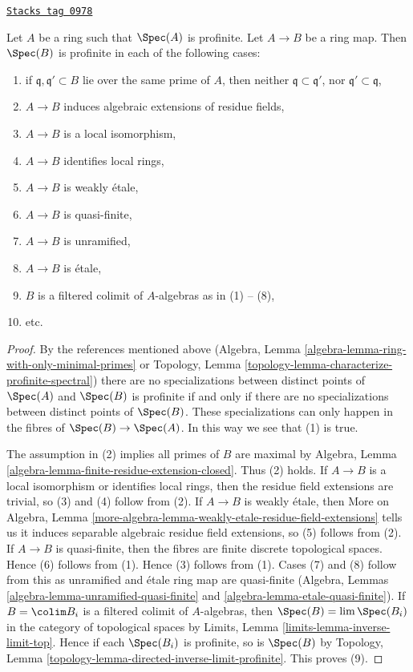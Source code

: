 \begin{lemma}
\label{proetale-lemma-profinite-goes-up}
\href{https://stacks.math.columbia.edu/tag/0978}{\texttt{Stacks tag 0978}}

Let $A$ be a ring such that $\Spec(A)$ is profinite. Let $A \to B$ be a
ring map. Then $\Spec(B)$ is profinite in each of the following cases:
\begin{enumerate}
\item if $\mathfrak q,\mathfrak q' \subset B$ lie over the same
prime of $A$, then neither $\mathfrak q \subset \mathfrak q'$, nor
$\mathfrak q' \subset \mathfrak q$,
\item $A \to B$ induces algebraic extensions of residue fields,
\item $A \to B$ is a local isomorphism,
\item $A \to B$ identifies local rings,
\item $A \to B$ is weakly \'etale,
\item $A \to B$ is quasi-finite,
\item $A \to B$ is unramified,
\item $A \to B$ is \'etale,
\item $B$ is a filtered colimit of $A$-algebras as in (1) -- (8),
\item etc.
\end{enumerate}
\end{lemma}

\begin{proof}
By the references mentioned above
(Algebra, Lemma \ref{algebra-lemma-ring-with-only-minimal-primes} or
Topology, Lemma \ref{topology-lemma-characterize-profinite-spectral})
there are no specializations between distinct points of $\Spec(A)$ and
$\Spec(B)$ is profinite if and only if there are no specializations
between distinct points of $\Spec(B)$. These specializations can only
happen in the fibres of $\Spec(B) \to \Spec(A)$. In this way we see
that (1) is true.

\medskip\noindent
The assumption in (2) implies all primes of $B$ are maximal by
Algebra, Lemma \ref{algebra-lemma-finite-residue-extension-closed}.
Thus (2) holds.
If $A \to B$ is a local isomorphism or identifies local rings,
then the residue field extensions are trivial, so (3) and (4)
follow from (2).
If $A \to B$ is weakly \'etale, then More on Algebra, Lemma
\ref{more-algebra-lemma-weakly-etale-residue-field-extensions}
tells us it induces separable algebraic residue field extensions, so
(5) follows from (2).
If $A \to B$ is quasi-finite, then the fibres are finite discrete
topological spaces. Hence (6) follows from (1).
Hence (3) follows from (1). Cases (7) and (8)
follow from this as unramified and \'etale ring map are quasi-finite
(Algebra, Lemmas
\ref{algebra-lemma-unramified-quasi-finite} and
\ref{algebra-lemma-etale-quasi-finite}).
If $B = \colim B_i$ is a filtered colimit of $A$-algebras, then
$\Spec(B) = \lim \Spec(B_i)$ in the category of topological spaces by
Limits, Lemma \ref{limits-lemma-inverse-limit-top}.
Hence if each $\Spec(B_i)$ is profinite, so is $\Spec(B)$ by
Topology, Lemma \ref{topology-lemma-directed-inverse-limit-profinite}.
This proves (9).
\end{proof}

